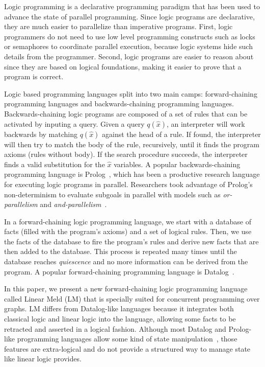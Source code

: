 Logic programming is a declarative programming paradigm that has been used to advance the state of parallel programming.
Since logic programs are declarative, they are much easier to parallelize than imperative programs. First, logic programmers do not
need to use low level programming constructs such as locks or semaphores to coordinate parallel execution, because logic
systems hide such details from the programmer. Second, logic programs are easier to reason about since they are based on logical
foundations, making it easier to prove that a program is correct.

Logic based programming languages split into two main camps: forward-chaining programming languages and backwards-chaining 
programming languages. Backwards-chaining logic programs are composed of a set of rules that can be activated by inputing a query. Given a query $q(\hat{x})$, an interpreter will work backwards by matching $q(\hat{x})$ against the head of a rule. If found, the interpreter will then try to match the body of the rule, recursively, until it finds the program axioms (rules without body). If the search procedure succeeds, the interpreter finds a valid substitution for the $\hat{x}$ variables. A popular backwards-chaining programming
language is Prolog~\cite{Colmerauer:1993:BP:154766.155362}, which has been a productive research language for executing logic
programs in parallel. Researchers took advantage of Prolog's non-determinism to evaluate subgoals
in parallel with models such as \emph{or-parallelism} and \emph{and-parallelism}~\cite{Gupta:2001:PEP:504083.504085}.

In a forward-chaining logic programming language, we start with a database of facts (filled with the program's
axioms) and a set of logical rules. Then, we use the facts of the database to fire the program's rules and derive new facts that are
then added to the database. This process is repeated many times until the database reaches \emph{quiescence} and no more information can
be derived from the program.
A popular forward-chaining programming language is Datalog~\cite{Ramakrishnan93asurvey}.

In this paper, we present a new forward-chaining logic programming language called Linear Meld (LM) that is specially suited
for concurrent programming over graphs. LM differs from Datalog-like languages because it integrates both classical
logic and linear logic into the language, allowing some facts to be retracted and asserted in a logical fashion. Although most
Datalog and Prolog-like programming languages allow some kind of state manipulation~\cite{Liu98extendingdatalog}, those features
are extra-logical and do not provide a structured way to manage state like linear logic provides.

